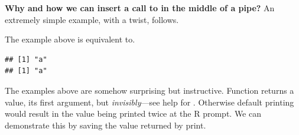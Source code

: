 \documentclass[krantz2]{krantz}\usepackage{knitr}%
\begin{document}
\begin{explainbox}
\textbf{Why and how we can insert a call to  in the middle of a pipe?} An extremely simple example, with a twist, follows.

\begin{knitrout}\footnotesize
{}\color{fgcolor}
\end{knitrout}

The example above is equivalent to.

\begin{knitrout}\footnotesize
{}\color{fgcolor}\begin{kframe}
\begin{alltt}
\hlstd{(}\hlstd{(}\hlstd{))}
\end{alltt}
\begin{verbatim}
## [1] "a"
## [1] "a"
\end{verbatim}
\end{kframe}
\end{knitrout}

The examples above are somehow surprising but instructive. Function  returns a value, its first argument, but \emph{invisibly}---see help for . Otherwise default printing would result in the value being printed twice at the R prompt. We can demonstrate this by saving the value returned by print.


\end{explainbox}
\end{document}
